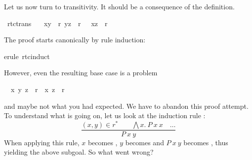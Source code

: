 \begin{isabellebody}
\begin{isamarkuptext}
Let us now turn to transitivity. It should be a consequence of the definition.%
\end{isamarkuptext}%
\ rtc{\isacharunderscore}trans{\isacharcolon}\isanewline
\ \ {\isachardoublequote}{\isasymlbrakk}\ {\isacharparenleft}x{\isacharcomma}y{\isacharparenright}\ {\isasymin}\ r{\isacharasterisk}{\isacharsemicolon}\ {\isacharparenleft}y{\isacharcomma}z{\isacharparenright}\ {\isasymin}\ r{\isacharasterisk}\ {\isasymrbrakk}\ {\isasymLongrightarrow}\ {\isacharparenleft}x{\isacharcomma}z{\isacharparenright}\ {\isasymin}\ r{\isacharasterisk}{\isachardoublequote}%
\begin{isamarkuptxt}%
\noindent
The proof starts canonically by rule induction:%
\end{isamarkuptxt}%
erule\ rtc{\isachardot}induct{\isacharparenright}%
\begin{isamarkuptxt}%
\noindent
However, even the resulting base case is a problem
\begin{isabelle}%
\ {}{\isachardot}\ {\isasymAnd}x{\isachardot}\ {\isacharparenleft}y{\isacharcomma}\ z{\isacharparenright}\ {\isasymin}\ r{\isacharasterisk}\ {\isasymLongrightarrow}\ {\isacharparenleft}x{\isacharcomma}\ z{\isacharparenright}\ {\isasymin}\ r{\isacharasterisk}%
\end{isabelle}
and maybe not what you had expected. We have to abandon this proof attempt.
To understand what is going on,
let us look at the induction rule :
\[ \frac{(x,y) \in r^* \qquad \bigwedge x.~P~x~x \quad \dots}{P~x~y} \]
When applying this rule, $x$ becomes , $y$ becomes
 and $P~x~y$ becomes , thus
yielding the above subgoal. So what went wrong?


\end{isamarkuptxt}
\end{isabellebody}
